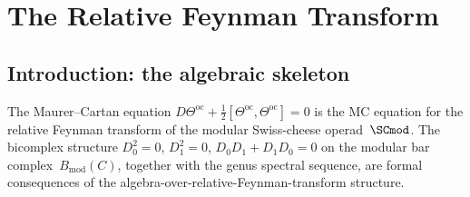
\providecommand{\SCchtop}{\mathsf{SC}^{\mathrm{ch,top}}}
\providecommand{\Bmod}{B_{\mathrm{mod}}}
\providecommand{\Bch}{B_{\mathrm{ch}}}
\providecommand{\barB}{\bar{B}}
\providecommand{\dfib}{d_{\mathrm{fib}}}
\providecommand{\dzero}{d_0}
\providecommand{\Dg}[1]{D_{#1}}
\providecommand{\FM}{\operatorname{FM}}
\providecommand{\Conf}{\operatorname{Conf}}
\providecommand{\Fact}{\operatorname{Fact}}
\providecommand{\Ainf}{\mathsf{A}_{\infty}}
\providecommand{\Linf}{\mathsf{L}_{\infty}}
\providecommand{\Eone}{\mathsf{E}_1}
\providecommand{\Etwo}{\mathsf{E}_2}
\providecommand{\Ass}{\mathsf{Ass}}
\providecommand{\Com}{\mathsf{Com}}
\providecommand{\Lie}{\mathsf{Lie}}
\providecommand{\Ran}{\operatorname{Ran}}
\providecommand{\Coder}{\operatorname{Coder}}
\providecommand{\Hom}{\operatorname{Hom}}
\providecommand{\Aut}{\operatorname{Aut}}
\providecommand{\cA}{\mathcal{A}}
\providecommand{\cM}{\mathcal{M}}
\providecommand{\C}{\mathbb{C}}
\providecommand{\R}{\mathbb{R}}
\providecommand{\Z}{\mathbb{Z}}
\providecommand{\gr}{\mathrm{gr}}
\providecommand{\id}{\operatorname{id}}
\providecommand{\StGraph}{\mathsf{SGraph}}
\providecommand{\orline}{\mathfrak{o}}
\providecommand{\Omegach}{\Omega^{\mathrm{ch}}}
\providecommand{\OHT}{C_\ast\!\bigl(W(\SCchtop)\bigr)}
\providecommand{\mc}{\operatorname{MC}}
\providecommand{\FT}{\mathrm{FT}}
\providecommand{\Phig}{\Phi_g}
\providecommand{\iotaalpha}{\iota_\alpha}
\providecommand{\talpha}{t_\alpha}
\providecommand{\bL}{\mathbf{L}}
\providecommand{\Ad}{\operatorname{Ad}}

\chapter{The Relative Feynman Transform}
\label{ch:relative-feynman}

\section{Introduction: the algebraic skeleton}
\label{sec:rft-introduction}

The Maurer--Cartan equation $D\Theta^{\mathrm{oc}} + \tfrac{1}{2}[\Theta^{\mathrm{oc}}, \Theta^{\mathrm{oc}}] = 0$ is the MC equation for the relative Feynman transform of the modular Swiss-cheese operad~$\SCmod$. The bicomplex structure $D_0^2 = 0$, $D_1^2 = 0$, $D_0 D_1 + D_1 D_0 = 0$ on the modular bar complex~$\Bmod(C)$, together with the genus spectral sequence, are formal consequences of the algebra-over-relative-Feynman-transform structure.

